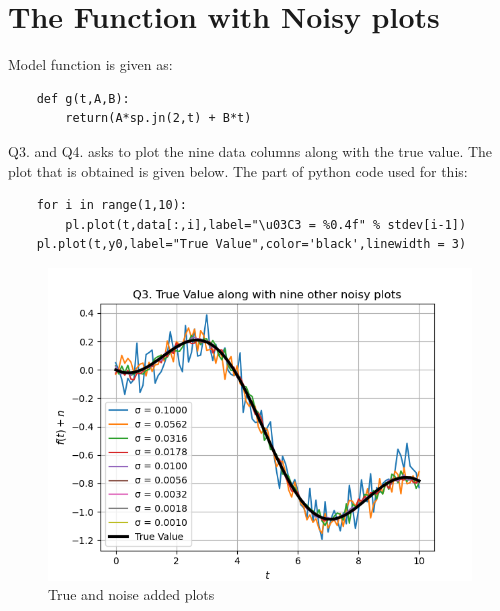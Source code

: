 \documentclass[11pt, a4paper]{article}
\begin{document}
\section{The Function with Noisy plots}
Model function is given as:
\begin{verbatim}	
    def g(t,A,B):
        return(A*sp.jn(2,t) + B*t)
\end{verbatim}

Q3. and Q4. asks to plot the nine data columns along with the true value. The plot that is obtained is given below. The part of python code used for this:
\begin{verbatim}	
    for i in range(1,10):
        pl.plot(t,data[:,i],label="\u03C3 = %0.4f" % stdev[i-1])
    pl.plot(t,y0,label="True Value",color='black',linewidth = 3)	
\end{verbatim}
\begin{figure}[h]
   	\centering
   	\includegraphics[scale=0.6]{Figure 0.png}   
   	\caption{True and noise added plots}
   	\label{fig:Figure 1}
\end{figure} 
   
\end{document}
